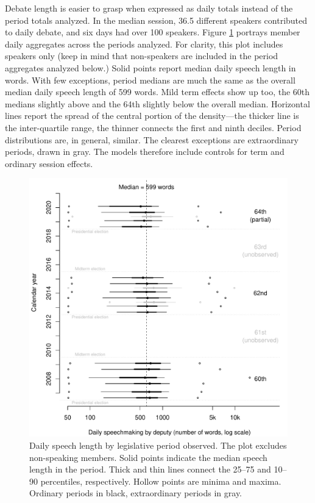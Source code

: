 \documentclass[letter,12pt]{article}
\begin{document}


Debate length is easier to grasp when expressed as daily totals instead of the period totals analyzed. In the median session, 36.5 different speakers contributed to daily debate, and six days had over 100 speakers. Figure \ref{F:quantiles} portrays member daily aggregates across the periods analyzed. For clarity, this plot includes speakers only (keep in mind that non-speakers are included in the period aggregates analyzed below.) Solid points report median daily speech length in words. With few exceptions, period medians are much the same as the overall median daily speech length of 599 words. Mild term effects show up too, the 60th medians slightly above and the 64th slightly below the overall median. Horizontal lines report the spread of the central portion of the density---the thicker line is the inter-quartile range, the thinner connects the first and ninth deciles. Period distributions are, in general, similar. The clearest exceptions are extraordinary periods, drawn in gray. The models therefore include controls for term and ordinary session effects.

\begin{figure}
  \centering
    \includegraphics[width=.5\columnwidth]{../plots/quantiles-periodo.pdf}
    \caption{Daily speech length by legislative period observed. The plot excludes non-speaking members. Solid points indicate the median speech length in the period. Thick and thin lines connect the 25--75 and 10--90 percentiles, respectively. Hollow points are minima and maxima. Ordinary periods in black, extraordinary periods in gray.}\label{F:quantiles}
\end{figure}
\end{document}
